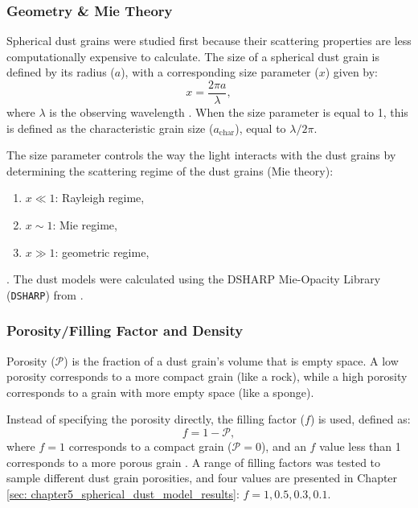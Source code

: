 \subsubsection{Geometry \& Mie Theory}

Spherical dust grains were studied first because their scattering properties are less computationally expensive to calculate. The size of a spherical dust grain is defined by its radius ($a$), with a corresponding size parameter ($x$) given by:
\begin{equation}
 x = \frac{2\pi a}{\lambda},
\end{equation}
\noindent where $\lambda$ is the observing wavelength \citep{Zhang2023}. When the size parameter is equal to 1, this is defined as the characteristic grain size ($a_{\text{char}}$), equal to $\lambda/2\pi$. 


The size parameter controls the way the light interacts with the dust grains by determining the scattering regime of the dust grains (Mie theory):
\begin{enumerate}
    \item $x \ll 1$: Rayleigh regime,
    \item $x \sim 1$: Mie regime,
    \item $x \gg 1$: geometric regime,
\end{enumerate}
\noindent \citep{Zhang2023}. 
The dust models were calculated using the DSHARP Mie-Opacity Library (\texttt{DSHARP}) from \cite{dsharp_code}. 








\subsubsection{Porosity/Filling Factor and Density}
Porosity ($\mathcal{P}$) is the fraction of a dust grain's volume that is empty space. A low porosity corresponds to a more compact grain (like a rock), while a high porosity corresponds to a grain with more empty space (like a sponge).

Instead of specifying the porosity directly, the filling factor ($f$) is used, defined as:
\begin{equation}
 f = 1 - \mathcal{P},
    \label{eq: filling factor}
\end{equation}
\noindent where $f=1$ corresponds to a compact grain ($\mathcal{P} = 0$), and an $f$ value less than 1 corresponds to a more porous grain \citep{Zhang2023}. A range of filling factors was tested to sample different dust grain porosities, and four values are presented in Chapter \ref{sec: chapter5_spherical_dust_model_results}: $f = 1, 0.5, 0.3, 0.1$. 


